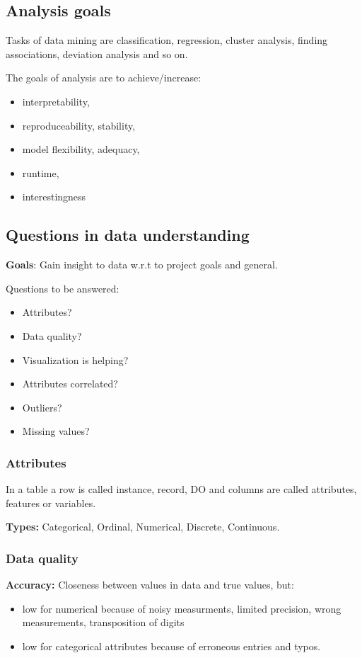 \documentclass[fleqn, oneside, 10pt, titlepage]{article}
\begin{document}
\subsection{Analysis goals}
Tasks of data mining are classification, regression, cluster analysis, finding associations, deviation analysis and so on.

The goals of analysis are to achieve/increase:

\begin{itemize}
	\item interpretability,
	\item reproduceability, stability,
	\item model flexibility, adequacy,
	\item runtime,
	\item interestingness
\end{itemize}

\subsection{Questions in data understanding}
\textbf{Goals}: Gain insight to data w.r.t to project goals and general.

Questions to be answered:
\begin{itemize}
	\item Attributes?
	\item Data quality?
	\item Visualization is helping?
	\item Attributes correlated?
	\item Outliers?
	\item Missing values?
\end{itemize}

\subsubsection{Attributes}
In a table a row is called instance, record, DO and columns are called attributes, features or variables.

\textbf{Types:} Categorical, Ordinal, Numerical, Discrete, Continuous.

\subsubsection{Data quality}
\textbf{Accuracy:} Closeness between values in data and true values, but:
\begin{itemize}
	\item low for numerical because of noisy measurments, limited precision, wrong measurements, transposition of digits
	\item low for categorical attributes because of erroneous entries and typos.
\end{itemize}
\end{document}
